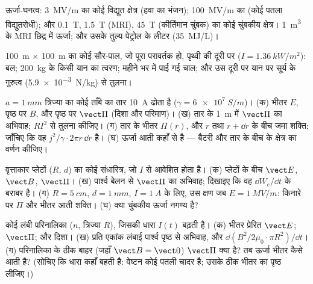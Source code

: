 \begin{exercise}[$\star$]\label{exo:b2:poynting-vector:3}
ऊर्जा-घनत्व: \qty{3}{MV/m} का कोई विद्युत क्षेत्र (हवा का भंजन);
\qty{100}{MV/m} का (कोई पतला विद्युतरोधी); और \qty{0.1}{T},
\qty{1.5}{T} (MRI), \qty{45}{T} (कीर्तिमान चुंबक) का कोई चुंबकीय क्षेत्र। \qty{1}{m^3} के MRI
छिद्र में ऊर्जा; और उसके तुल्य पेट्रोल के लीटर (\qty{35}{MJ/L})।
\end{exercise}

\begin{exercise}[$\star$]\label{exo:b2:poynting-vector:4}
\qty{100}{m} $\times$ \qty{100}{m} का कोई सौर-पाल, जो पूरा परावर्तक हो,
पृथ्वी की दूरी पर ($I = \qty{1.36}{kW/m^2}$): बल; \qty{200}{kg} के किसी
यान का त्वरण; महीने भर में पाई गई चाल; और उस दूरी पर यान पर सूर्य के
गुरुत्व (\qty{5.9e-3}{N/kg}) से तुलना।
\end{exercise}

\begin{exercise}[$\star\star$]\label{exo:b2:poynting-vector:5}
$a = \qty{1}{mm}$ त्रिज्या का कोई ताँबे का तार \qty{10}{A} ढोता है ($\gamma =
\qty{6e7}{S/m}$)। (क) भीतर $E$, पृष्ठ पर $B$, और पृष्ठ पर $\vect\Pi$
(दिशा और परिमाण)। (ख) तार के \qty{1}{m} में $\vect\Pi$ का अभिवाह;
$RI^2$ से तुलना कीजिए। (ग) तार के भीतर $\Pi(r)$, और $r$ तथा $r + \dd r$ के बीच
जमा शक्ति; जाँचिए कि वह $j^2/\gamma\cdot2\pi r\,\dd r$ है।
(घ) ऊर्जा आती कहाँ से है --- बैटरी और तार के बीच के क्षेत्र का
वर्णन कीजिए।
\end{exercise}

\begin{exercise}[$\star\star$]\label{exo:b2:poynting-vector:6}
वृत्ताकार प्लेटों ($R$, $d$) का कोई संधारित्र, जो $I$ से आवेशित होता है। (क) प्लेटों के बीच $\vect E$, $\vect B$,
$\vect\Pi$। (ख) पार्श्व बेलन से $\vect\Pi$ का अभिवाह;
दिखाइए कि वह $\dd W_e/\dd t$ के बराबर है। (ग) $R = \qty{5}{cm}$, $d =
\qty{1}{mm}$, $I = \qty{1}{A}$ के लिए, उस क्षण जब $E = \qty{1}{MV/m}$: किनारे पर $\Pi$
और भीतर आती शक्ति। (घ) क्या चुंबकीय ऊर्जा नगण्य है?
\end{exercise}

\begin{exercise}[$\star\star$]\label{exo:b2:poynting-vector:7}
कोई लंबी परिनालिका ($n$, त्रिज्या $R$), जिसकी धारा $I(t)$ बढ़ती है। (क)
भीतर प्रेरित $\vect E$; $\vect\Pi$; और दिशा। (ख) प्रति एकांक लंबाई पार्श्व पृष्ठ से
अभिवाह, और $\dd(B^2/2\mu_0\cdot\pi R^2)/\dd t$। (ग)
परिनालिका के ठीक बाहर (जहाँ $\vect B = \vect 0$) $\vect\Pi$ क्या है?
तब ऊर्जा भीतर कैसे आती है? (सोचिए कि धारा कहाँ बहती है:
वेष्टन कोई पतली चादर है; उसके ठीक भीतर का पृष्ठ लीजिए।)
\end{exercise}

